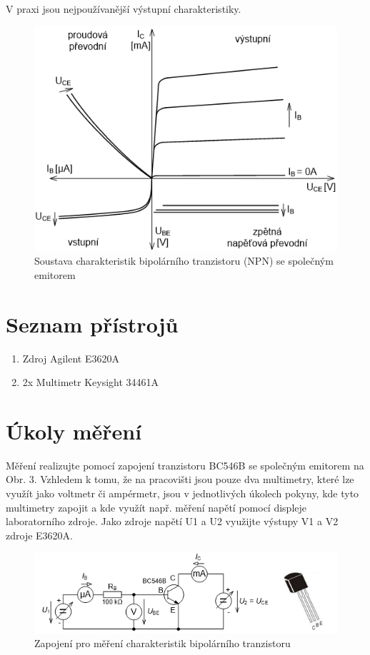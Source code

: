\documentclass[a4paper, czech]{article}
\begin{document}
V praxi jsou nejpoužívanější výstupní charakteristiky.

\begin{figure}[H]
    \centering
    \includegraphics{soustava_charakteristik.png}
    \caption{Soustava charakteristik bipolárního tranzistoru (NPN) se společným emitorem}
    \label{obr:1}
\end{figure}

\section{Seznam přístrojů}

\begin{enumerate}
    \item Zdroj Agilent E3620A
    \item 2x Multimetr Keysight 34461A
\end{enumerate}

\section{Úkoly měření}

Měření realizujte pomocí zapojení tranzistoru BC546B se společným emitorem na Obr. 3. Vzhledem k tomu, že na pracovišti jsou pouze dva multimetry, které lze využít jako voltmetr či ampérmetr, jsou v jednotlivých úkolech pokyny, kde tyto multimetry zapojit a kde využít např. měření napětí pomocí displeje laboratorního zdroje. Jako zdroje napětí U1 a U2 využijte výstupy V1 a V2 zdroje E3620A.

\begin{figure}[H]
    \centering
    \includegraphics{zapojeni.png}
    \caption{Zapojení pro měření charakteristik bipolárního tranzistoru}
    \label{obr:1}
\end{figure}
\end{document}
